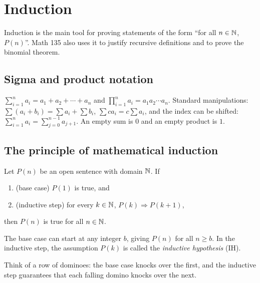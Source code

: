 \chapter{Induction}

Induction is the main tool for proving statements of the form ``for all $n \in \mathbb{N}$, $P(n)$''.
Math 135 also uses it to justify recursive definitions and to prove the binomial theorem.

\section{Sigma and product notation}

$\sum_{i=1}^n a_i = a_1 + a_2 + \cdots + a_n$ and $\prod_{i=1}^n a_i = a_1 a_2 \cdots a_n$.
Standard manipulations: $\sum (a_i + b_i) = \sum a_i + \sum b_i$, $\sum c a_i = c \sum a_i$,
and the index can be shifted: $\sum_{i=1}^n a_i = \sum_{j=0}^{n-1} a_{j+1}$.
An empty sum is $0$ and an empty product is $1$.

\section{The principle of mathematical induction}

\begin{theorem}
Let $P(n)$ be an open sentence with domain $\mathbb{N}$. If
\begin{enumerate}
  \item (base case) $P(1)$ is true, and
  \item (inductive step) for every $k \in \mathbb{N}$, $P(k) \Rightarrow P(k+1)$,
\end{enumerate}
then $P(n)$ is true for all $n\in\mathbb{N}$.
\end{theorem}

The base case can start at any integer $b$, giving $P(n)$ for all $n \ge b$. In the inductive
step, the assumption $P(k)$ is called the \emph{inductive hypothesis} (IH).

Think of a row of dominoes: the base case knocks over the first, and the inductive step
guarantees that each falling domino knocks over the next.

\begin{center}
\end{center}


